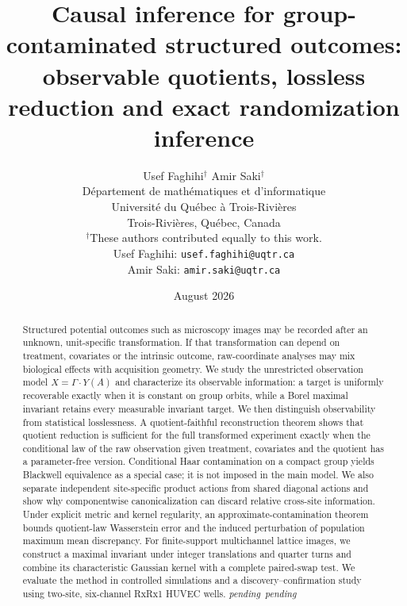 \documentclass[11pt]{article}
\theoremstyle{plain}
\theoremstyle{definition}
\numberwithin{equation}{section}
\newcommand{\1}{\mathbf 1}
\newcommand{\pending}{\textnormal{\textit{pending}}}
\providecommand{\AbstractSimulationResult}{\pending}
\providecommand{\AbstractRxResult}{\pending}
\begin{document}
\title{Causal inference for group-contaminated structured outcomes:\\
observable quotients, lossless reduction and exact randomization inference}
\author{
	Usef Faghihi$^{\dagger}$ \qquad Amir Saki$^{\dagger}$\\[0.5em]
	\small Département de mathématiques et d'informatique\\
	\small Université du Québec à Trois-Rivières\\
	\small Trois-Rivières, Québec, Canada\\[0.3em]
	\small $^{\dagger}$These authors contributed equally to this work.\\
	\small Usef Faghihi: \texttt{usef.faghihi@uqtr.ca}\\
	\small Amir Saki: \texttt{amir.saki@uqtr.ca}
}
\date{August 2026}
\maketitle

\begin{abstract}
Structured potential outcomes such as microscopy images may be recorded after an unknown, unit-specific transformation. If that transformation can depend on treatment, covariates or the intrinsic outcome, raw-coordinate analyses may mix biological effects with acquisition geometry. We study the unrestricted observation model $X=\Gamma\cdot Y(A)$ and characterize its observable information: a target is uniformly recoverable exactly when it is constant on group orbits, while a Borel maximal invariant retains every measurable invariant target. We then distinguish observability from statistical losslessness. A quotient-faithful reconstruction theorem shows that quotient reduction is sufficient for the full transformed experiment exactly when the conditional law of the raw observation given treatment, covariates and the quotient has a parameter-free version. Conditional Haar contamination on a compact group yields Blackwell equivalence as a special case; it is not imposed in the main model. We also separate independent site-specific product actions from shared diagonal actions and show why componentwise canonicalization can discard relative cross-site information. Under explicit metric and kernel regularity, an approximate-contamination theorem bounds quotient-law Wasserstein error and the induced perturbation of population maximum mean discrepancy. For finite-support multichannel lattice images, we construct a maximal invariant under integer translations and quarter turns and combine its characteristic Gaussian kernel with a complete paired-swap test. We evaluate the method in controlled simulations and a discovery--confirmation study using two-site, six-channel RxRx1 HUVEC wells. \AbstractSimulationResult\ \AbstractRxResult
\end{abstract}
\end{document}
